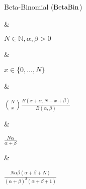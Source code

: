 Beta-Binomial ($\operatorname{BetaBin}$)

&

$N \in \mathbb N, \alpha, \beta > 0$

&

$x \in \{0, \dotsc, N\}$

&

\(\displaystyle
	\binom{N}{x} \frac{B(x + \alpha, N - x + \beta)}{B(\alpha, \beta)}
\)

& 

$\frac{N\alpha}{\alpha + \beta}$

&

$\frac{N\alpha\beta(\alpha + \beta + N)}{(\alpha + \beta)^2(\alpha + \beta + 1)}$